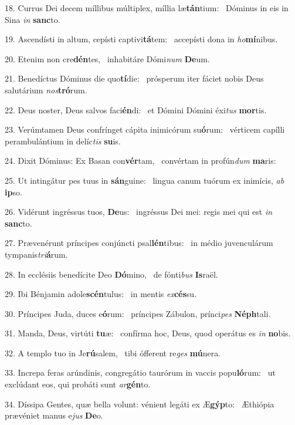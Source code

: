 18. Currus Dei decem míllibus múltiplex, míllia læ\textbf{tán}tium: \ast\  Dóminus in eis in Sina \textit{in} \textbf{sanc}to.\

19. Ascendísti in altum, cepísti captivi\textbf{tá}tem: \ast\  accepísti dona in \textit{ho}\textbf{mí}nibus.\

20. Etenim non cre\textbf{dén}tes, \ast\  inhabitáre Dómi\textit{num} \textbf{De}um.\

21. Benedíctus Dóminus die quo\textbf{tí}die: \ast\  prósperum iter fáciet nobis Deus salutárium \textit{nos}\textbf{tró}rum.\

22. Deus noster, Deus salvos faci\textbf{én}di: \ast\  et Dómini Dómini éxi\textit{tus} \textbf{mor}tis.\

23. Verúmtamen Deus confrínget cápita inimicórum su\textbf{ó}rum: \ast\  vérticem capílli perambulántium in delíc\textit{tis} \textbf{su}is.\

24. Dixit Dóminus: Ex Basan con\textbf{vér}tam, \ast\  convértam in profún\textit{dum} \textbf{ma}ris:\

25. Ut intingátur pes tuus in \textbf{sán}guine: \ast\  lingua canum tuórum ex inimícis, \textit{ab} \textbf{ip}so.\

26. Vidérunt ingréssus tuos, \textbf{De}us: \ast\  ingréssus Dei mei: regis mei qui est \textit{in} \textbf{sanc}to.\

27. Prævenérunt príncipes conjúncti psal\textbf{lén}tibus: \ast\  in médio juvenculárum tympanis\textit{tri}\textbf{á}rum.\

28. In ecclésiis benedícite Deo \textbf{Dó}mino, \ast\  de fónti\textit{bus} \textbf{Is}raël.\

29. Ibi Bénjamin adole\textbf{scén}tulus: \ast\  in mentis \textit{ex}\textbf{cés}su.\

30. Príncipes Juda, duces e\textbf{ó}rum: \ast\  príncipes Zábulon, prínci\textit{pes} \textbf{Néph}tali.\

31. Manda, Deus, virtúti \textbf{tu}æ: \ast\  confírma hoc, Deus, quod operátus es \textit{in} \textbf{no}bis.\

32. A templo tuo in Je\textbf{rú}salem, \ast\  tibi ófferent re\textit{ges} \textbf{mú}nera.\

33. Increpa feras arúndinis, congregátio taurórum in vaccis popu\textbf{ló}rum: \ast\  ut exclúdant eos, qui probáti sunt \textit{ar}\textbf{gén}to.\

34. Díssipa Gentes, quæ bella volunt: vénient legáti ex Æ\textbf{gýp}to: \ast\  Æthiópia prævéniet manus e\textit{jus} \textbf{De}o.\

